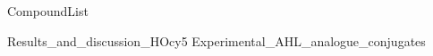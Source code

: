 \documentclass[10pt,a4paper]{article}
\begin{document}
	

{CompoundList}





{Results_and_discussion_HOcy5}
\newpage
{Experimental_AHL_analogue_conjugates}

\newpage
{}


\listoftodos
\end{document}
